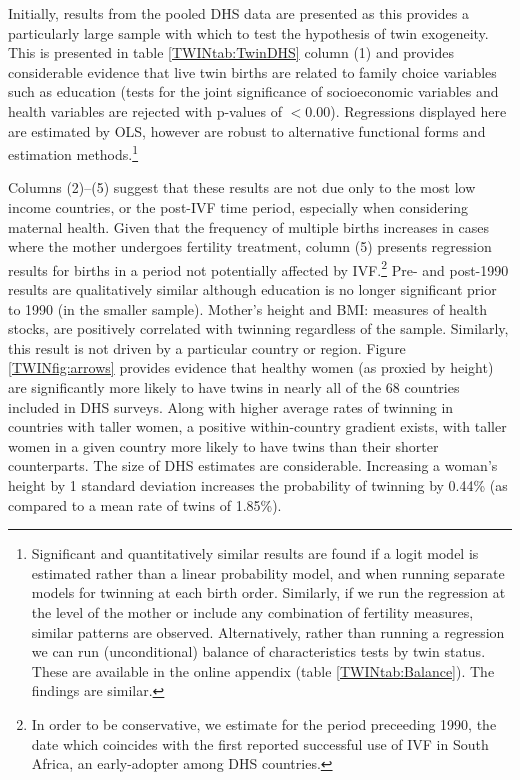 \documentclass[subeqn]{article}
\begin{document}
\begin{spacing}{1.4}
Initially, results from the pooled DHS data are presented as this provides a 
particularly large sample with which to test the hypothesis of twin exogeneity. 
This is presented in table \ref{TWINtab:TwinDHS} column (1) and provides 
considerable evidence that live twin births are related to family choice 
variables such as education (tests for the joint significance of socioeconomic 
variables and health variables are rejected with p-values of $<$0.00).  
Regressions displayed here are estimated by OLS, however are robust to 
alternative functional forms and estimation methods.\footnote{Significant and 
quantitatively similar results are found if a logit model is estimated rather 
than a linear probability model, and when running separate models for twinning at 
each birth order. Similarly, if we run the regression at the level of the mother 
or include any combination of fertility measures, similar patterns are observed.
Alternatively, rather than running a regression we can run (unconditional) balance 
of characteristics tests by twin status.  These are available in the online 
appendix (table \ref{TWINtab:Balance}).  The findings are similar.}

Columns (2)--(5) suggest that these results are not due only to the most low 
income countries, or the post-IVF time period, especially when considering 
maternal health.  Given that the frequency of multiple births increases in 
cases where the mother undergoes fertility treatment, column (5) presents 
regression results for births in a period not potentially affected by 
IVF.\footnote{In order to be conservative, we estimate for the period 
preceeding 1990, the date which coincides with the first reported successful 
use of IVF in South Africa, an early-adopter among DHS countries.}  Pre- and 
post-1990 results are qualitatively similar although education is no longer 
significant prior to 1990 (in the smaller sample). Mother's height and BMI:
measures of health stocks, are positively correlated with twinning regardless
of the sample.  Similarly, this result is not driven by a particular country
or region.  Figure \ref{TWINfig:arrows} provides evidence that healthy women (as 
proxied by height) are significantly more likely to have twins in nearly all of 
the 68 countries included in DHS surveys.  Along with higher average rates of 
twinning in countries with taller women, a positive within-country gradient 
exists, with taller women in a given country more likely to have twins than their 
shorter counterparts. The size of DHS estimates are considerable. Increasing a
woman's height by 1 standard deviation increases the probability of twinning by 
0.44\% (as compared to a mean rate of twins of 1.85\%).


\end{spacing}
\end{document}
